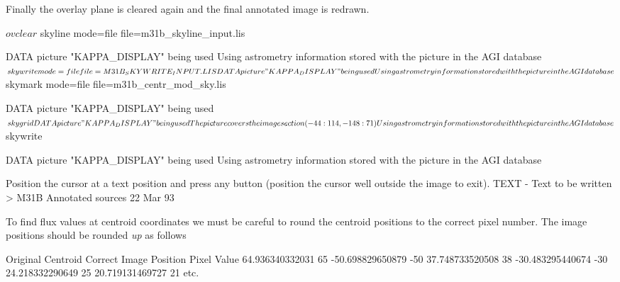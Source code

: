 \documentclass[twoside,11pt]{starlink}
\begin{document}
\begin{small}
\end{small}
Finally the overlay plane is cleared again and the final annotated image is
redrawn.
\begin{small}
\begin{terminalv}
$ ovclear
$ skyline mode=file file=m31b_skyline_input.lis

  DATA picture "KAPPA_DISPLAY" being used
  Using astrometry information stored with the picture in the AGI database
$ skywrite mode=file file=M31B_SKYWRITE_INPUT.LIS

  DATA picture "KAPPA_DISPLAY" being used
  Using astrometry information stored with the picture in the AGI database
$ skymark mode=file file=m31b_centr_mod_sky.lis

  DATA picture "KAPPA_DISPLAY" being used
$ skygrid

  DATA picture "KAPPA_DISPLAY" being used
  The picture covers the image section ( -44:114, -148:71 )
  Using astrometry information stored with the picture in the AGI database

$ skywrite

  DATA picture "KAPPA_DISPLAY" being used
  Using astrometry information stored with the picture in the AGI database

  Position the cursor at a text position and press any button (position the
cursor well outside the image to exit).
TEXT - Text to be written > M31B Annotated sources 22 Mar 93
\end{terminalv}
\end{small}

To find flux values at centroid coordinates we must be careful to round the
centroid positions to the correct pixel number. The image positions should be
rounded \emph{up} as follows
\begin{small}
\begin{terminalv}
   Original Centroid            Correct
   Image Position              Pixel Value
   64.936340332031                 65
  -50.698829650879                -50
   37.748733520508                 38
  -30.483295440674                -30
   24.218332290649                 25
   20.719131469727                 21
                    etc.
\end{terminalv}
\end{small}
\end{document}

